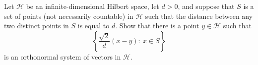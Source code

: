 Let \( \mathcal{H}\) be an infinite-dimensional Hilbert space, let \( d>0\), and suppose that \( S\) is a set of points (not necessarily countable) in \( \mathcal{H}\) such that the distance between any two distinct points in \( S\) is equal to \( d\). Show that there is a point \( y\in\mathcal{H}\) such that
\[ \left\{\frac{\sqrt{2}}{d}(x-y): \ x\in S\right\}\]
is an orthonormal system of vectors in \( \mathcal{H}\).